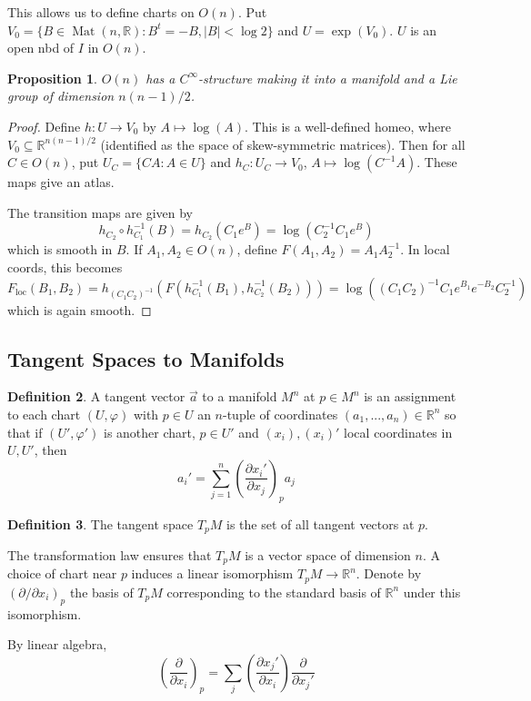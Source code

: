 \documentclass{article}
\theoremstyle{definition}
\newtheorem{defn}{Definition}[section]
\theoremstyle{remark}
\theoremstyle{plain}
\newtheorem{prop}[defn]{Proposition}
\newcommand{\RR}{\mathbb{R}}
\begin{document}
This allows us to define charts on $O(n)$. Put $V_0=\{B\in\operatorname{Mat}(n,\RR):B^t=-B,|B|<\log 2\}$ and $U=\exp(V_0)$. $U$ is an open nbd of $I$ in $O(n)$.
\begin{prop}
    $O(n)$ has a $C^\infty$-structure making it into a manifold and a Lie group of dimension $n(n-1)/2$.
\end{prop}
\begin{proof}
Define $h:U\to V_0$ by $A\mapsto \log(A)$. This is a well-defined homeo, where $V_0\subseteq\RR^{n(n-1)/2}$ (identified as the space of skew-symmetric matrices). Then for all $C\in O(n)$, put $U_C=\{CA:A\in U\}$ and $h_C:U_C\to V_0$, $A\mapsto \log(C^{-1}A)$.
These maps give an atlas.

The transition maps are given by 
\[h_{C_2}\circ h_{C_1}^{-1}(B)=h_{C_2}(C_1e^B)=\log(C_2^{-1}C_1e^B)\]
which is smooth in $B$.
If $A_1,A_2\in O(n)$, define $F(A_1,A_2)=A_1A_2^{-1}$. In local coords, this becomes
\[F_{\text{loc}}(B_1,B_2)=h_{(C_1C_2)^{-1}}(F(h_{C_1}^{-1}(B_1),h_{C_2}^{-1}(B_2)))=\log((C_1C_2)^{-1}C_1e^{B_1}e^{-B_2}C_2^{-1})\]
which is again smooth.
\end{proof}

\subsection{Tangent Spaces to Manifolds}
\begin{defn}
    A tangent vector $\Vec{a}$ to a manifold $M^n$ at $p\in M^n$ is an assignment to each chart $(U,\varphi)$ with $p\in U$ an $n$-tuple of coordinates $(a_1,...,a_n)\in \RR^n$ so that if $(U',\varphi')$ is another chart, $p\in U'$ and $(x_i), (x_i)'$ local coordinates in $U,U'$, then 
    \[a_i'=\sum_{j=1}^n\left(\dfrac{\partial x_i'}{\partial x_j}\right)_pa_j\]
\end{defn}
\begin{defn}
    The tangent space $T_pM$ is the set of all tangent vectors at $p$.
\end{defn}
The transformation law ensures that $T_pM$ is a vector space of dimension $n$. A choice of chart near $p$ induces a linear isomorphism $T_pM\to\RR^n$. Denote by $(\partial/\partial x_i)_p$ the basis of $T_pM$ corresponding to the standard basis of $\RR^n$ under this isomorphism.

By linear algebra, \[
\left(\dfrac{\partial}{\partial x_i}\right)_p=\sum_j\left(\dfrac{\partial x_j'}{\partial x_i}\right)\dfrac{\partial}{\partial x_j'}
\]
\end{document}
